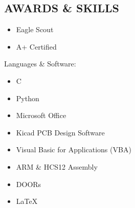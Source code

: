 \documentclass[line,margin]{res}
\begin{document}
\begin{resume}
\section{AWARDS \& SKILLS } 
		\begin{multicols}{2}
			\begin{itemize}
				\itemsep -2pt
				\item[] Eagle Scout
				\item[] A+ Certified

			\end{itemize}
		\end{multicols}
	\vspace{-10pt}
	{Languages \& Software:} %
		\begin{multicols}{2}
			\begin{itemize}
				\itemsep -2pt
				\item[] C
				\item[] Python
				\item[] Microsoft Office
				\item[] Kicad PCB Design Software
				\item[] Visual Basic for Applications (VBA)
				\item[] ARM \& HCS12 Assembly
				\item[] DOORs
				\item[] \LaTeX 
			\end{itemize}
		\end{multicols}

\end{resume}
\end{document}
